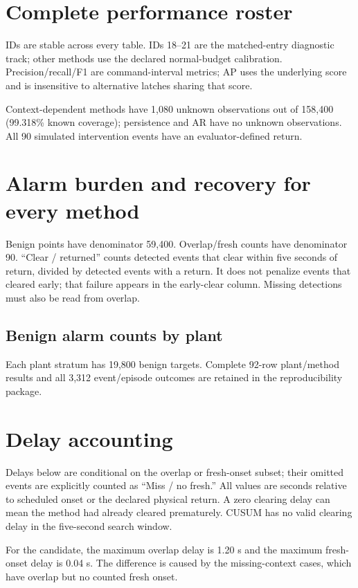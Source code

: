 \section{Complete performance roster}\label{app:all}
IDs are stable across every table. IDs 18--21 are the matched-entry diagnostic track; other methods use the declared normal-budget calibration. Precision/recall/F1 are command-interval metrics; AP uses the underlying score and is insensitive to alternative latches sharing that score.
\begin{center}\small\end{center}
Context-dependent methods have 1,080 unknown observations out of 158,400 (99.318\% known coverage); persistence and AR have no unknown observations. All 90 simulated intervention events have an evaluator-defined return. 
\clearpage
\section{Alarm burden and recovery for every method}
Benign points have denominator 59,400. Overlap/fresh counts have denominator 90. ``Clear / returned'' counts detected events that clear within five seconds of return, divided by detected events with a return. It does not penalize events that cleared early; that failure appears in the early-clear column. Missing detections must also be read from overlap.
\begin{center}\small\end{center}
\subsection*{Benign alarm counts by plant}
\begin{center}\small\end{center}
Each plant stratum has 19,800 benign targets. Complete 92-row plant/method results and all 3,312 event/episode outcomes are retained in the reproducibility package.
\clearpage
\section{Delay accounting}
Delays below are conditional on the overlap or fresh-onset subset; their omitted events are explicitly counted as ``Miss / no fresh.'' All values are seconds relative to scheduled onset or the declared physical return. A zero clearing delay can mean the method had already cleared prematurely. CUSUM has no valid clearing delay in the five-second search window.
\begin{center}\small\end{center}
For the candidate, the maximum overlap delay is 1.20 s and the maximum fresh-onset delay is 0.04 s. The difference is caused by the missing-context cases, which have overlap but no counted fresh onset. 
\clearpage
